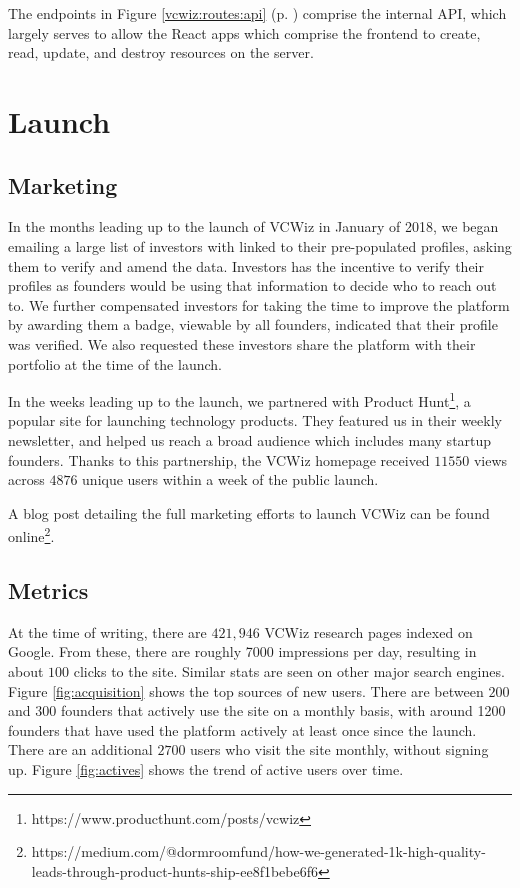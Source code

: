 The endpoints in Figure \ref{vcwiz:routes:api} (p. \pageref{vcwiz:routes:api}) comprise the internal API, which largely serves to allow the React apps which comprise the frontend to create, read, update, and destroy resources on the server.

\section{Launch}

\subsection{Marketing}

In the months leading up to the launch of VCWiz in January of 2018, we began emailing a large list of investors with linked to their pre-populated profiles, asking them to verify and amend the data. Investors has the incentive to verify their profiles as founders would be using that information to decide who to reach out to. We further compensated investors for taking the time to improve the platform by awarding them a badge, viewable by all founders, indicated that their profile was verified. We also requested these investors share the platform with their portfolio at the time of the launch.

In the weeks leading up to the launch, we partnered with Product Hunt\footnote{https://www.producthunt.com/posts/vcwiz}, a popular site for launching technology products. They featured us in their weekly newsletter, and helped us reach a broad audience which includes many startup founders. Thanks to this partnership, the VCWiz homepage received $11550$ views across $4876$ unique users within a week of the public launch.

A blog post detailing the full marketing efforts to launch VCWiz can be found online\footnote{https://medium.com/@dormroomfund/how-we-generated-1k-high-quality-leads-through-product-hunts-ship-ee8f1bebe6f6}.

\subsection{Metrics}

At the time of writing, there are $421,946$ VCWiz research pages indexed on Google. From these, there are roughly 7000 impressions per day, resulting in about $100$ clicks to the site. Similar stats are seen on other major search engines. Figure \ref{fig:acquisition} shows the top sources of new users. There are between $200$ and $300$ founders that actively use the site on a monthly basis, with around 1200 founders that have used the platform actively at least once since the launch. There are an additional $2700$ users who visit the site monthly, without signing up. Figure \ref{fig:actives} shows the trend of active users over time.

